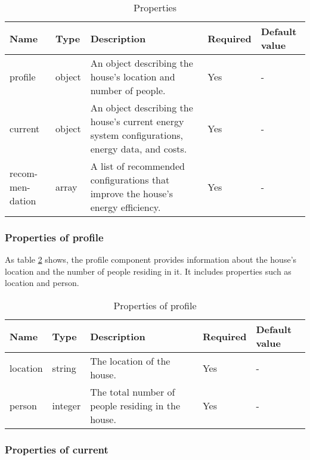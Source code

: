 \begin{table}[h!]
    \centering
    \small
    \begin{tabular}{ | p{} | p{} | p{} | p{} | p{} | } 
      \hline
      Name & Type & Description & Required & Default value \\
      \hline
      profile & object & An object describing the house's location and number of people. & Yes & - \\
      \hline
      current & object & An object describing the house's current energy system configurations, energy data, and costs. & Yes & - \\
      \hline
      recom-men-dation & array & A list of recommended configurations that improve the house's energy efficiency. & Yes & - \\
      \hline
    \end{tabular}
    \caption{Properties}
    \label{tab:properties}
\end{table}


\subsubsection{Properties of profile}

As table \ref{tab:properties_profile} shows, the profile component provides information about the house's location and the number of people residing in it. 
It includes properties such as location and person.

\begin{table}[h!]
    \centering
    \small
    \begin{tabular}{ | p{} | p{} | p{} | p{} | p{} | } 
    \hline
    Name & Type & Description & Required & Default value \\
    \hline
    location & string & The location of the house. & Yes & - \\
    \hline
    person & integer & The total number of people residing in the house. & Yes & - \\
    \hline
    \end{tabular}
    \caption{Properties of profile}
    \label{tab:properties_profile}
\end{table}


\subsubsection{Properties of current}

